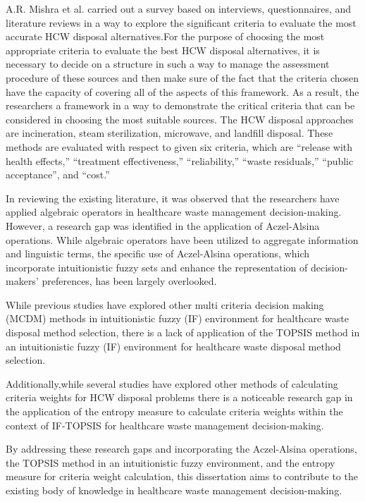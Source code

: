 \begin{flushleft}
A.R. Mishra et al. \cite{7} carried out a survey based on interviews,
questionnaires, and literature reviews in a way to explore the significant
criteria to evaluate the most accurate HCW disposal
alternatives.For the purpose of choosing the most appropriate criteria to
evaluate the best HCW disposal alternatives, it is necessary to
decide on a structure in such a way to manage the assessment
procedure of these sources and then make sure of the fact that the
criteria chosen have the capacity of covering all of the aspects of
this framework. As a result, the researchers a framework
 in a way to demonstrate the critical criteria that
can be considered in choosing the most suitable sources.
The HCW disposal approaches are incineration, steam sterilization,
microwave, and landfill disposal. These methods are evaluated
with respect to given six criteria, which are “release with
health effects,” “treatment effectiveness,” “reliability,” “waste residuals,”
“public acceptance”, and “cost.”

\vspace{5mm}

In reviewing the existing literature, it was observed that the researchers have applied algebraic operators in healthcare waste management decision-making. However, a research gap was identified in the application of Aczel-Alsina operations. While algebraic operators have been utilized to aggregate information and linguistic terms, the specific use of Aczel-Alsina operations, which incorporate intuitionistic fuzzy sets and enhance the representation of decision-makers' preferences, has been largely overlooked.

\vspace{5mm}

While previous studies have explored other multi criteria decision making (MCDM) methods in intuitionistic fuzzy (IF) environment for healthcare waste disposal method selection,  there is a lack of application of the TOPSIS method in an intuitionistic fuzzy (IF) environment for healthcare waste disposal method selection.

\vspace{5mm}

Additionally,while several studies have explored other methods of calculating criteria weights for HCW disposal problems there is a noticeable research gap in the application of the entropy measure to calculate criteria weights within the context of IF-TOPSIS for healthcare waste management decision-making. 

\vspace{5mm}

By addressing these research gaps and incorporating the Aczel-Alsina operations, the TOPSIS method in an intuitionistic fuzzy environment, and the entropy measure for criteria weight calculation, this dissertation aims to contribute to the existing body of knowledge in healthcare waste management decision-making.
\end{flushleft}